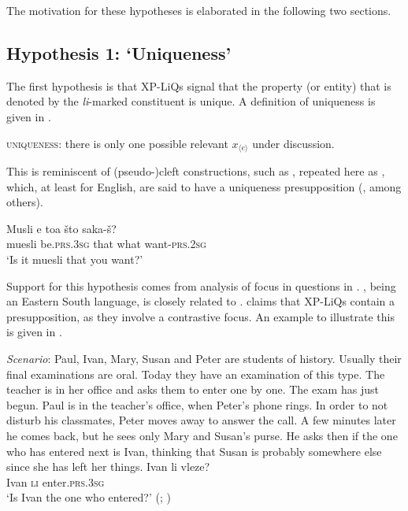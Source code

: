\documentclass[output=paper,
colorlinks,
citecolor=brown,
newtxmath
]{langscibook}
\begin{document}
\noindent
The motivation for these hypotheses is elaborated in the following two sections.


\subsection{Hypothesis 1: `Uniqueness'}\label{sec:uniqueness}

The first hypothesis is that XP-LiQs signal that the property (or entity) that is denoted by the \textit{li}-marked constituent is unique. A definition of uniqueness is given in .


\ea \textsc{uniqueness}: there is only one possible relevant $x_{\langle e \rangle}$ under discussion. \label{uniqueness}
\z

\noindent
This is reminiscent of (pseudo-)cleft constructions, such as , repeated here as , which, at least for English, are said to have a uniqueness presupposition (\citealt{drenhaus2011}, among others).


\ea \gll Musli e toa što saka-š? \\
muesli be.\textsc{prs.3sg} that what want-\textsc{prs.2sg} \\
\glt `Is it muesli that you want?'
\label{cleft2}
\z

\noindent
Support for this hypothesis comes from  analysis of focus in questions in . , being an Eastern South  language, is closely related to . \citet{dukova2010} claims that XP-LiQs contain a presupposition, as they involve a contrastive focus. An example to illustrate this is given in .


\eanoraggedright
\eanoraggedright \textit{Scenario}: Paul, Ivan, Mary, Susan and Peter are students of history. Usually their final
examinations are oral. Today they have an examination of this type. The teacher is in her
office and asks them to enter one by one. The exam has just begun. Paul is in the teacher's
office, when Peter's phone rings. In order to not disturb his classmates, Peter moves away to
answer the call. A few minutes later he comes back, but he sees only Mary and Susan's purse.
He asks then if the one who has entered next is Ivan, thinking that Susan is probably
somewhere else since she has left her things.
\ex \gll Ivan li vleze? \\
Ivan \textsc{li} enter.\textsc{prs.3sg} \\
\glt `Is Ivan the one who entered?' \hfill (;  \citealt[258]{dukova2010})
\label{ivan}
\z\z
\end{document}

